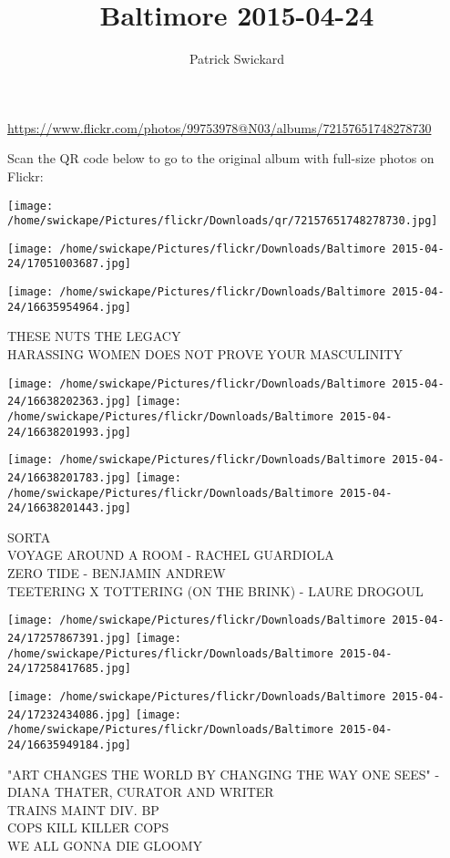 \documentclass[10pt,letterpaper]{article}
\title{Baltimore 2015-04-24}
\author{Patrick Swickard}
\date{}
\begin{document}
\maketitle

\url{https://www.flickr.com/photos/99753978@N03/albums/72157651748278730}

Scan the QR code below to go to the original album with full-size photos on Flickr:

\texttt{[image: /home/swickape/Pictures/flickr/Downloads/qr/72157651748278730.jpg]}
\pagebreak

\texttt{[image: /home/swickape/Pictures/flickr/Downloads/Baltimore 2015-04-24/17051003687.jpg]}

\vspace{0.25in}
\texttt{[image: /home/swickape/Pictures/flickr/Downloads/Baltimore 2015-04-24/16635954964.jpg]}

THESE NUTS THE LEGACY\\
HARASSING WOMEN DOES NOT PROVE YOUR MASCULINITY
\pagebreak

\texttt{[image: /home/swickape/Pictures/flickr/Downloads/Baltimore 2015-04-24/16638202363.jpg]}
\texttt{[image: /home/swickape/Pictures/flickr/Downloads/Baltimore 2015-04-24/16638201993.jpg]}

\texttt{[image: /home/swickape/Pictures/flickr/Downloads/Baltimore 2015-04-24/16638201783.jpg]}
\texttt{[image: /home/swickape/Pictures/flickr/Downloads/Baltimore 2015-04-24/16638201443.jpg]}

SORTA\\
VOYAGE AROUND A ROOM {-} RACHEL GUARDIOLA\\
ZERO TIDE {-} BENJAMIN ANDREW\\
TEETERING X TOTTERING (ON THE BRINK) {-} LAURE DROGOUL
\pagebreak

\texttt{[image: /home/swickape/Pictures/flickr/Downloads/Baltimore 2015-04-24/17257867391.jpg]}
\texttt{[image: /home/swickape/Pictures/flickr/Downloads/Baltimore 2015-04-24/17258417685.jpg]}

\texttt{[image: /home/swickape/Pictures/flickr/Downloads/Baltimore 2015-04-24/17232434086.jpg]}
\texttt{[image: /home/swickape/Pictures/flickr/Downloads/Baltimore 2015-04-24/16635949184.jpg]}

"ART CHANGES THE WORLD BY CHANGING THE WAY ONE SEES" {-} DIANA THATER, CURATOR AND WRITER\\
TRAINS MAINT DIV. BP\\
COPS KILL KILLER COPS\\
WE ALL GONNA DIE GLOOMY
\pagebreak
\end{document}
